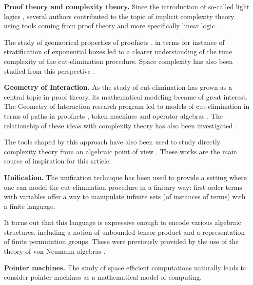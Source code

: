 \textbf{Proof theory and complexity theory.} Since the introduction of so-called light logics \cite{girard_light_1994}, several authors contributed to the topic of implicit complexity theory using tools coming from proof theory and more specifically linear logic \cite{girard_linear_1987}.

The study of geometrical properties of proofnets \cite{girard_linear_1987}, in terms for instance of stratification of exponential boxes \cite{baillot_linear_2010} led to a clearer understanding of the time complexity of the cut-elimination procedure. Space complexity has also been studied from this perspective \cite{schopp_stratified_2007,gaboardi_logical_2008}.

\smallskip\noindent
\textbf{Geometry of Interaction.} As the study of cut-elimination has grown as a central topic in proof theory, its mathematical modeling became of great interest.
The Geometry of Interaction \cite{girard_towards_1989} research program led to models of cut-elimination in terms of paths in proofnets \cite{asperti_paths_1994}, token machines \cite{laurent_token_2001} and operator algebras \cite{girard_geometry_1989}.
The relationship of these ideas with complexity theory has also been investigated \cite{schopp_space-efficient_2006,baillot_elementary_2001}.

The tools shaped by this approach have also been used to study directly complexity theory from an algebraic point of view \cite{girard_normativity_2012,aubert_characterizing_2012,seiller_logarithmic_2013}.
These works are the main source of inspiration for this article.

\smallskip\noindent
\textbf{Unification.} The unification technique has been used \cite{girard_geometry_1995,baillot_elementary_2001,girard_three_lightings} to provide a setting where one can model the cut-elimination procedure in a finitary way: first-order terms with variables offer a way to manipulate infinite sets (of instances of terms) with a finite language.

It turns out that this language is expressive enough to encode various algebraic structures, including a notion of unbounded tensor product and a representation of finite permutation groups.
These were previously provided by the use of the theory of von Neumann algebras \cite{girard_normativity_2012,aubert_characterizing_2012,seiller_logarithmic_2013}.

\smallskip\noindent
\textbf{Pointer machines.} The study of space efficient computations naturally leads to consider pointer machines as a mathematical model of computing.%

